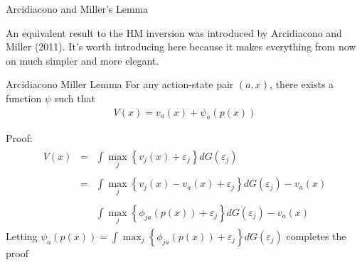 \documentclass[xcolor=pdftex,dvipsnames,table,mathserif]{beamer}
\begin{document}
\begin{frame}{Arcidiacono and Miller's Lemma}

An equivalent result to the HM inversion was introduced by Arcidiacono and Miller (2011). 
It's worth introducing here because it makes everything from now on much simpler
and more elegant.


\begin{block}{Arcidiacono Miller Lemma}
For any action-state pair $\left(a,x\right)$, there exists a function
$\psi$ such that 
\begin{eqnarray*}
V\left(x\right)=v_{a}\left(x\right)+\psi_{a}\left(p\left(x\right)\right)
\end{eqnarray*}
\end{block}

Proof:
\begin{eqnarray*}
\begin{array}{ccl}
V\left(x\right) & = & \int\max_{j}\left\{ v_{j}\left(x\right)+\varepsilon_{j}\right\} dG\left(\varepsilon_{j}\right)\\
\\
 & = & \int\max_{j}\left\{ v_{j}\left(x\right)-v_{a}\left(x\right)+\varepsilon_{j}\right\} dG\left(\varepsilon_{j}\right)-v_{a}\left(x\right)\\
\\
 &  & \int\max_{j}\left\{ \phi_{ja}\left(p\left(x\right)\right)+\varepsilon_{j}\right\} dG\left(\varepsilon_{j}\right)-v_{a}\left(x\right)
\end{array}
\end{eqnarray*}
Letting $\psi_{a}\left(p\left(x\right)\right)=\int\max_{j}\left\{ \phi_{ja}\left(p\left(x\right)\right)+\varepsilon_{j}\right\} dG\left(\varepsilon_{j}\right)$ completes the proof
\end{frame}
\end{document}
